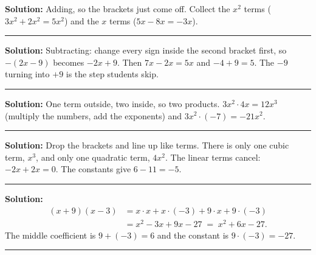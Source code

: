 \documentclass[12pt]{article}
\begin{document}



\textbf{Solution:} \quad Adding, so the brackets just come off. Collect the $x^2$ terms
($3x^2 + 2x^2 = 5x^2$) and the $x$ terms ($5x - 8x = -3x$). 

\vspace{0.15cm}\noindent\rule{\linewidth}{0.2pt}


\textbf{Solution:} \quad Subtracting: change every sign inside the second bracket first, so
$-(2x - 9)$ becomes $-2x + 9$. Then $7x - 2x = 5x$ and $-4 + 9 = 5$. The $-9$ turning into $+9$
is the step students skip. 

\vspace{0.15cm}\noindent\rule{\linewidth}{0.2pt}


\textbf{Solution:} \quad One term outside, two inside, so two products.
$3x^2 \cdot 4x = 12x^3$ (multiply the numbers, add the exponents) and
$3x^2\cdot(-7) = -21x^2$. 

\vspace{0.15cm}\noindent\rule{\linewidth}{0.2pt}


\textbf{Solution:} \quad Drop the brackets and line up like terms. There is only one cubic term,
$x^3$, and only one quadratic term, $4x^2$. The linear terms cancel: $-2x + 2x = 0$. The constants
give $6 - 11 = -5$. 

\vspace{0.15cm}\noindent\rule{\linewidth}{0.2pt}


\textbf{Solution:}
\begin{align*}
  (x+9)(x-3) &= x\cdot x + x\cdot(-3) + 9\cdot x + 9\cdot(-3)\\
             &= x^2 - 3x + 9x - 27 \;=\; x^2 + 6x - 27.
\end{align*}
The middle coefficient is $9 + (-3) = 6$ and the constant is $9\cdot(-3) = -27$. 

\vspace{0.15cm}\noindent\rule{\linewidth}{0.2pt}
\end{document}
